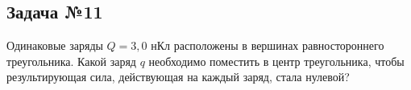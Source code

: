 \subsection{Задача №11}

Одинаковые заряды $Q=3,0$ нКл расположены в вершинах равностороннего треугольника. Какой заряд $q$ необходимо поместить в центр треугольника, чтобы результирующая сила, действующая на каждый заряд, стала нулевой?